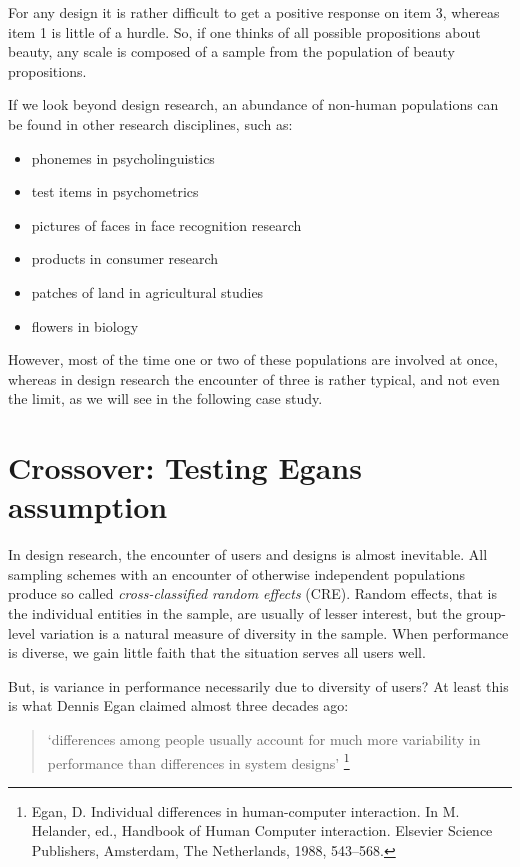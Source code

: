 \documentclass[]{svmono}
\providecommand{\tightlist}{%
  \setlength{\itemsep}{0pt}\setlength{\parskip}{0pt}}
\begin{document}
For any design it is rather difficult to get a positive response on item
3, whereas item 1 is little of a hurdle. So, if one thinks of all
possible propositions about beauty, any scale is composed of a sample
from the population of beauty propositions.

If we look beyond design research, an abundance of non-human populations
can be found in other research disciplines, such as:

\begin{itemize}
\tightlist
\item
  phonemes in psycholinguistics
\item
  test items in psychometrics
\item
  pictures of faces in face recognition research
\item
  products in consumer research
\item
  patches of land in agricultural studies
\item
  flowers in biology
\end{itemize}

However, most of the time one or two of these populations are involved
at once, whereas in design research the encounter of three is rather
typical, and not even the limit, as we will see in the following case
study.

\section{Crossover: Testing Egans assumption}\label{crossover}

In design research, the encounter of users and designs is almost
inevitable. All sampling schemes with an encounter of otherwise
independent populations produce so called \emph{cross-classified random
effects} (CRE). Random effects, that is the individual entities in the
sample, are usually of lesser interest, but the group-level variation is
a natural measure of diversity in the sample. When performance is
diverse, we gain little faith that the situation serves all users well.

But, is variance in performance necessarily due to diversity of users?
At least this is what Dennis Egan claimed almost three decades ago:

\begin{quote}
`differences among people usually account for much more variability in
performance than differences in system designs' \footnote{Egan, D.
  Individual differences in human-computer interaction. In M. Helander,
  ed., Handbook of Human Computer interaction. Elsevier Science
  Publishers, Amsterdam, The Netherlands, 1988, 543--568.}
\end{quote}
\end{document}
